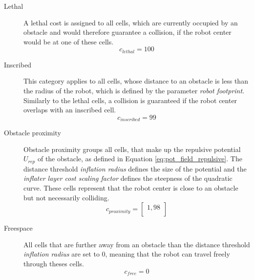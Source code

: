 \begin{description}
  \item[Lethal] A lethal cost is assigned to all cells, which are currently occupied by an obstacle and would therefore guarantee a collision, if the robot center would be at one of these cells.
  \begin{equation}
  c_{lethal} = 100
  \end{equation}
  \item[Inscribed] This category applies to all cells, whose distance to an obstacle is less than the radius of the robot, which is defined by the parameter \emph{robot footprint}. Similarly to the lethal cells, a collision is guaranteed if the robot center overlaps with an inscribed cell.
    \begin{equation}
  c_{inscribed} = 99
  \end{equation}
  \item[Obstacle proximity] Obstacle proximity groups all cells, that make up the repulsive potential $U_{rep}$ of the obstacle, as defined in Equation \ref{eq:pot_field_repulsive}. The distance threshold \emph{inflation radius} defines the size of the potential and the \emph{inflater layer cost scaling factor} defines the steepness of the quadratic curve. These cells represent that the robot center is close to an obstacle but not necessarily colliding.
    \begin{equation}
  c_{proximity} = \begin{bmatrix}
  1,98 \\ 
  \end{bmatrix}
  \end{equation}
  \item[Freespace] All cells that are further away from an obstacle than the distance threshold \emph{inflation radius} are set to 0, meaning that the robot can travel freely through theses cells.
    \begin{equation}
  c_{free} = 0
  \end{equation}
\end{description}

